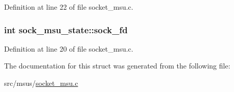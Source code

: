 Definition at line 22 of file socket\-\_\-msu.\-c.

\hypertarget{structsock__msu__state_a7621ea37a55e4419bd2e35da3be10ae3}{
\subsubsection[{sock\-\_\-fd}]{\setlength{\rightskip}{0pt plus 5cm}int sock\-\_\-msu\-\_\-state\-::sock\-\_\-fd}}\label{structsock__msu__state_a7621ea37a55e4419bd2e35da3be10ae3}


Definition at line 20 of file socket\-\_\-msu.\-c.



The documentation for this struct was generated from the following file\-:\begin{DoxyCompactItemize}
\item 
src/msus/\hyperlink{socket__msu_8c}{socket\-\_\-msu.\-c}\end{DoxyCompactItemize}
